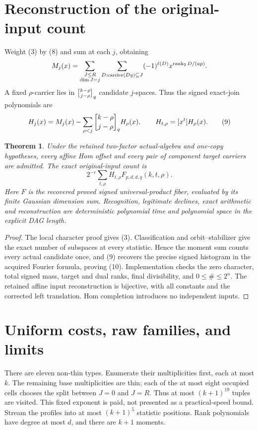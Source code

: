 \documentclass[11pt]{article}
\newtheorem{theorem}{Theorem}\newtheorem{lemma}{Lemma}
\begin{document}
\section{Reconstruction of the original-input count}
Weight (3) by (8) and sum at each $j$, obtaining
\[
 M_j(x)=\sum_{\substack{J\le R\\\dim J=j}}
 \sum_{D:\operatorname{carrier}(Dy)\subseteq J}
              (-1)^{\ell(D)}x^{\operatorname{rank}_2D/(ap)}.
\]
A fixed $\rho$-carrier lies in ${k-\rho\brack j-\rho}_q$ candidate
$j$-spaces. Thus the signed exact-join polynomials are
\[
 H_j(x)=M_j(x)-\sum_{\rho<j}{k-\rho\brack j-\rho}_qH_\rho(x),
 \qquad H_{t,\rho}=[x^t]H_\rho(x).\tag{9}
\]
\begin{theorem}
Under the retained two-factor actual-algebra and one-copy hypotheses,
every affine Hom offset and every pair of component target carriers
are admitted. The exact original-input count is
\[
 \boxed{2^{-c}\sum_{t,\rho}H_{t,\rho}F_{p,d,d,q}(k,t,\rho).}\tag{10}
\]
Here $F$ is the recovered proved signed universal-product fiber,
evaluated by its finite Gaussian dimension sum. Recognition, legitimate
declines, exact arithmetic and reconstruction are deterministic
polynomial time and polynomial space in the explicit DAG length.
\end{theorem}
\begin{proof}
The local character proof gives (3). Classification and orbit--stabilizer
give the exact number of subspaces at every statistic. Hence the moment
sum counts every actual candidate once, and (9) recovers the precise
signed histogram in the acquired Fourier formula, proving (10).
Implementation checks the zero character, total signed mass, target and
dual ranks, final divisibility, and $0\le\#\le2^n$. The retained affine
input reconstruction is bijective, with all constants and the corrected
left translation. Hom completion introduces no independent inputs.
\end{proof}

\section{Uniform costs, raw families, and limits}
There are eleven non-thin types. Enumerate their multiplicities first,
each at most $k$. The remaining base multiplicities are thin; each of
the at most eight occupied cells chooses the split between $J=0$ and
$J=R$. Thus at most $(k+1)^{19}$ tuples are visited. This fixed exponent
is paid, not presented as a practical-speed bound. Stream the profiles
into at most $(k+1)^5$ statistic positions. Rank polynomials have degree
at most $d$, and there are $k+1$ moments.
\end{document}
